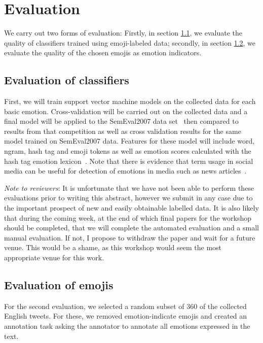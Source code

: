 \documentclass[10pt, a4paper]{article}
\begin{document}
\section{Evaluation}

We carry out two forms of evaluation: Firstly, in section \ref{sec:classifier_evaluation}, we evaluate the quality of classifiers trained using emoji-labeled data; secondly, in section \ref{sec:emoji_evaluation}, we evaluate the quality of the chosen emojis as emotion indicators.

\subsection{Evaluation of classifiers} \label{sec:classifier_evaluation}
First, we will train support vector machine models on the collected data for each basic emotion. 
Cross-validation will be carried out on the collected data and a final model will be applied to the SemEval2007 data set~\cite{Strapparava2007Semeval2007} then compared to results from that competition as well as cross validation results for the same model trained on SemEval2007 data.
Features for these model will include word, ngram, hash tag and emoji tokens as well as emotion scores calculated with the hash tag emotion lexicon~\cite{Mohammad2012Emotional}. Note that there is evidence that term usage in social media can be useful for detection of emotions in media such as news articles~\cite{Mohammad2012Emotional}.

{\em Note to reviewers}: It is unfortunate that we have not been able to perform these evaluations prior to writing this abstract, however we submit in any case due to the important prospect of new and easily obtainable labelled data. It is also likely that during the coming week, at the end of which final papers for the workshop should be completed, that we will complete the automated evaluation and a small manual evaluation. If not, I propose to withdraw the paper and wait for a future venue. This would be a shame, as this workshop would seem the most appropriate venue for this work.

\subsection{Evaluation of emojis} \label{sec:emoji_evaluation}

For the second evaluation, we selected a random subset of 360 of the collected English tweets. For these, we removed emotion-indicate emojis and created an annotation task asking the annotator to annotate all emotions expressed in the text.
\end{document}
